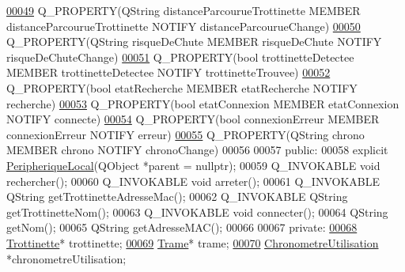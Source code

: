 \begin{DoxyCode}
\hyperlink{class_peripherique_local_a6b583dc9b350baf3edcc0cbc1611a6c5}{00049}     Q\_PROPERTY(QString distanceParcourueTrottinette MEMBER distanceParcourueTrottinette NOTIFY 
      distanceParcourueChange)
\hyperlink{class_peripherique_local_a79a43778c2db1c9c70784b6329dc383e}{00050}     Q\_PROPERTY(QString risqueDeChute MEMBER risqueDeChute NOTIFY risqueDeChuteChange)
\hyperlink{class_peripherique_local_af6f664b6af67f1c90eb017391ac812ed}{00051}     Q\_PROPERTY(\textcolor{keywordtype}{bool} trottinetteDetectee MEMBER trottinetteDetectee NOTIFY trottinetteTrouvee)
\hyperlink{class_peripherique_local_a6638c29f6f75c3b4d329d93ae6ea4a48}{00052}     Q\_PROPERTY(\textcolor{keywordtype}{bool} etatRecherche MEMBER etatRecherche NOTIFY recherche)
\hyperlink{class_peripherique_local_a5359e5a94b32b8a90c06ec999de13d2c}{00053}     Q\_PROPERTY(\textcolor{keywordtype}{bool} etatConnexion MEMBER etatConnexion NOTIFY connecte)
\hyperlink{class_peripherique_local_ad0e396b67eed256a7f27277ca7bfafdd}{00054}     Q\_PROPERTY(\textcolor{keywordtype}{bool} connexionErreur MEMBER connexionErreur NOTIFY erreur)
\hyperlink{class_peripherique_local_a8b994159d5d56a45b693b191963d5053}{00055}     Q\_PROPERTY(QString chrono MEMBER chrono NOTIFY chronoChange)
00056 
00057 public:
00058     explicit \hyperlink{class_peripherique_local}{PeripheriqueLocal}(QObject *parent = \textcolor{keywordtype}{nullptr}); 
00059     Q\_INVOKABLE \textcolor{keywordtype}{void} rechercher(); 
00060     Q\_INVOKABLE \textcolor{keywordtype}{void} arreter();
00061     Q\_INVOKABLE QString getTrottinetteAdresseMac(); 
00062     Q\_INVOKABLE QString getTrottinetteNom(); 
00063     Q\_INVOKABLE \textcolor{keywordtype}{void} connecter();
00064     QString getNom();
00065     QString getAdresseMAC();
00066 
00067 private:
\hyperlink{class_peripherique_local_aa110b2c3292270553f592362e45f710b}{00068}     \hyperlink{class_trottinette}{Trottinette}* trottinette; 
\hyperlink{class_peripherique_local_a3c96dbda4eacf235c2bb0cabaa742122}{00069}     \hyperlink{class_trame}{Trame}* trame; 
\hyperlink{class_peripherique_local_a89e0515901920b03e83066cf306f7f14}{00070}     \hyperlink{class_chronometre_utilisation}{ChronometreUtilisation} *chronometreUtilisation; 

\end{DoxyCode}
